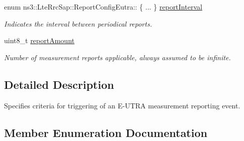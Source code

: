 \begin{DoxyCompactItemize}
enum ns3\+::\+Lte\+Rrc\+Sap\+::\+Report\+Config\+Eutra\+:: \{ ... \}  \hyperlink{structns3_1_1LteRrcSap_1_1ReportConfigEutra_a8688bf528a9f1a027fe8570965adacdb}{report\+Interval}
\begin{DoxyCompactList}\small\item\em Indicates the interval between periodical reports. \end{DoxyCompactList}\item 
uint8\+\_\+t \hyperlink{structns3_1_1LteRrcSap_1_1ReportConfigEutra_a3c7035b91b07fcf1c2b38ed0d1914b3d}{report\+Amount}
\begin{DoxyCompactList}\small\item\em Number of measurement reports applicable, always assumed to be infinite. \end{DoxyCompactList}\end{DoxyCompactItemize}


\subsection{Detailed Description}
Specifies criteria for triggering of an E-\/\+U\+T\+RA measurement reporting event. 

\subsection{Member Enumeration Documentation}
